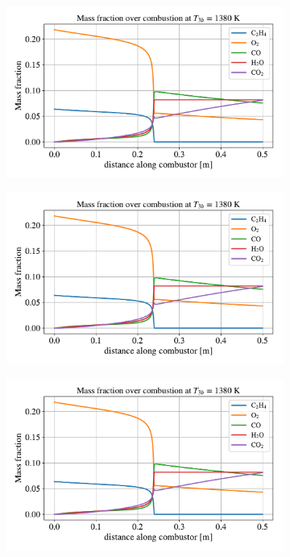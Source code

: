 \documentclass[a4paper]{article}
\begin{document}
\begin{figure}[h]
    \centering
    \begin{subfigure}[h]{0.49\linewidth}
        \includegraphics[width=\linewidth]{part_2_img/mass_fraction_1380.pdf}
    \end{subfigure}
    \begin{subfigure}[h]{0.49\linewidth}
        \includegraphics[width=\linewidth]{part_2_img/mass_fraction_1380.pdf}
    \end{subfigure}
    \begin{subfigure}[h]{0.49\linewidth}
        \includegraphics[width=\linewidth]{part_2_img/mass_fraction_1380.pdf}

\end{subfigure}
\end{figure}
\end{document}
